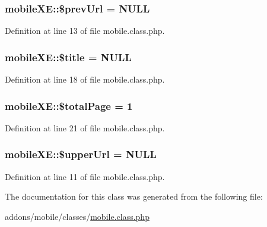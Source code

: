 \hypertarget{classmobileXE_acbc08c3fe06a6a5aaae6cbdc8738559f}{
\subsubsection[{\$prev\-Url}]{\setlength{\rightskip}{0pt plus 5cm}mobile\-X\-E\-::\$prev\-Url = N\-U\-L\-L}}\label{classmobileXE_acbc08c3fe06a6a5aaae6cbdc8738559f}


Definition at line 13 of file mobile.\-class.\-php.

\hypertarget{classmobileXE_aeb2ef82029883fd60174e3d0e9f7dcc3}{
\subsubsection[{\$title}]{\setlength{\rightskip}{0pt plus 5cm}mobile\-X\-E\-::\$title = N\-U\-L\-L}}\label{classmobileXE_aeb2ef82029883fd60174e3d0e9f7dcc3}


Definition at line 18 of file mobile.\-class.\-php.

\hypertarget{classmobileXE_a0d7bcada3689f84f67337d02c8dd6f21}{
\subsubsection[{\$total\-Page}]{\setlength{\rightskip}{0pt plus 5cm}mobile\-X\-E\-::\$total\-Page = 1}}\label{classmobileXE_a0d7bcada3689f84f67337d02c8dd6f21}


Definition at line 21 of file mobile.\-class.\-php.

\hypertarget{classmobileXE_a643b9ca5393066afea26819e4f1cf115}{
\subsubsection[{\$upper\-Url}]{\setlength{\rightskip}{0pt plus 5cm}mobile\-X\-E\-::\$upper\-Url = N\-U\-L\-L}}\label{classmobileXE_a643b9ca5393066afea26819e4f1cf115}


Definition at line 11 of file mobile.\-class.\-php.



The documentation for this class was generated from the following file\-:\begin{DoxyCompactItemize}
\item 
addons/mobile/classes/\hyperlink{mobile_8class_8php}{mobile.\-class.\-php}\end{DoxyCompactItemize}
